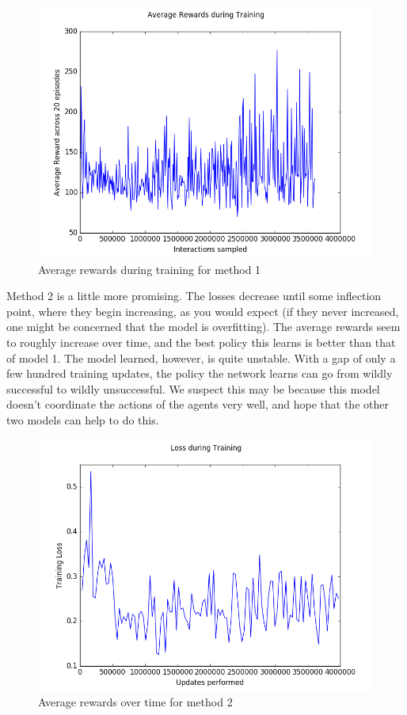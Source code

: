 \documentclass{article}
\begin{document}
\begin{figure}[H]
\centering
\includegraphics[scale=0.5]{dqn-average-reward}
\caption{Average rewards during training for method 1}
\end{figure}

Method 2 is a little more promising. The losses decrease until some inflection
point, where they begin increasing, as you would expect (if they never
increased, one might be concerned that the model is overfitting). The average
rewards seem to roughly increase over time, and the best policy this learns is
better than that of model 1. The model learned, however, is quite
unstable. With a gap of only a few hundred training updates, the policy the
network learns can go from wildly successful to wildly unsuccessful. We suspect
this may be because this model doesn't coordinate the actions of the agents very
well, and hope that the other two models can help to do this.

\begin{figure}[H]
\centering
\includegraphics[scale=0.5]{dqn-multi-training-loss}
\caption{Average rewards over time for method 2}
\end{figure}
\end{document}
